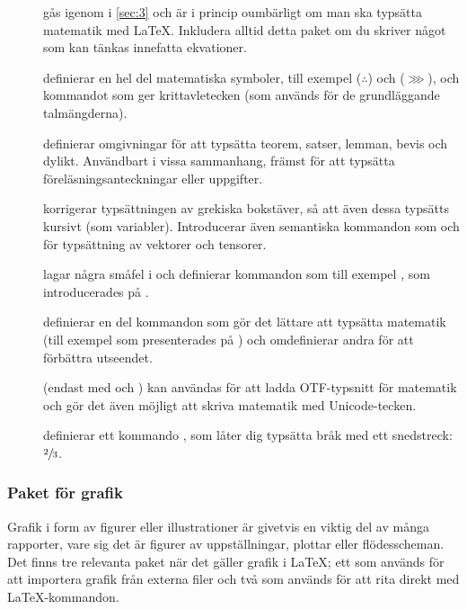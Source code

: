 \documentclass[lang=sv,ptsize=10pt,font=none,nomath,titles=bf,../../a4.tex]{subfiles}
\begin{document}
\begin{description}
	\item[]
	gås igenom i \cref{sec:3} och är i princip oumbärligt om man ska
	typsätta matematik med \LaTeX. Inkludera alltid detta paket om du
	skriver något som kan tänkas innefatta ekvationer.

	\item[]
	definierar en hel del matematiska symboler, till exempel 
	 (\(\therefore\)) och  (\(\ggg\)), och 
	kommandot  som ger krittavletecken (som
	används för de grundläggande talmängderna).
	
	\item[]
	definierar omgivningar för att typsätta teorem, satser, lemman, bevis
	och dylikt. Användbart i vissa sammanhang, främst för att typsätta
	föreläsningsanteckningar eller uppgifter. 
	
	\item[{}]
	korrigerar typsättningen av grekiska bokstäver, så att även dessa typsätts
	kursivt (som variabler). Introducerar även semantiska kommandon som
	 och  för typsättning av vektorer
	och tensorer.
	
	\item[]
	lagar några småfel i  och definierar kommandon som till
	exempel , som introducerades på
	.

	\item[]
	definierar en del kommandon som gör det lättare att typsätta matematik
	(till exempel  som presenterades på )
	och omdefinierar andra för att förbättra utseendet.

	\item[{}]
		(endast med \XeTeX och )
	kan användas för att ladda \textsc{OTF}-typsnitt för matematik och
	gör det även möjligt att skriva matematik med Unicode-tecken.

	\item[{}]
	definierar ett kommando , som låter dig typsätta bråk
	med ett snedstreck: \(\sfrac{2}{3}\).
\end{description}

\subsubsection{Paket för grafik}
Grafik i form av figurer eller illustrationer är givetvis en viktig del
av många rapporter, vare sig det är figurer av uppställningar, plottar
eller flödesscheman. Det finns tre relevanta paket när det gäller grafik
i \LaTeX; ett som används för att importera grafik från externa filer och
två som används för att rita direkt med \LaTeX-kommandon.
\end{document}

